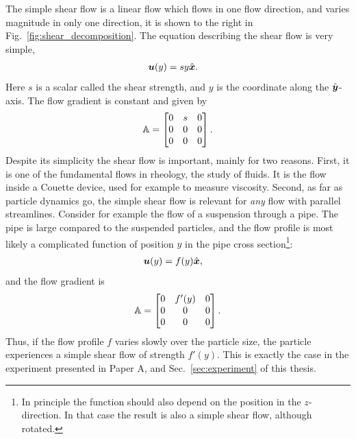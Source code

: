 \documentclass[thesis.tex]{subfiles}
\begin{document}
The simple shear flow is a linear flow which flows in one flow direction, and varies magnitude in only one direction, it is shown to the right in Fig.~\ref{fig:shear_decomposition}. The equation describing the shear flow is very simple,
\begin{align*}
	\mbox{\boldmath$u$}(y) &= s y \hat{\mbox{\boldmath$x$}}.
\end{align*}
Here $s$ is a scalar called the shear strength, and $y$ is the coordinate along the $\hat{\mbox{\boldmath$y$}}$-axis. The flow gradient is constant and given by
\begin{align*}
	\mathbb{A} = \begin{bmatrix}
		0 & s & 0 \\
		0 & 0 & 0 \\
		0 & 0 & 0 
	\end{bmatrix}.
\end{align*}
Despite its simplicity the shear flow is important, mainly for two reasons. First, it is one of the fundamental flows in rheology, the study of fluids. It is the flow inside a Couette device, used for example to measure viscosity. Second, as far as particle dynamics go, the simple shear flow is relevant for \emph{any} flow with parallel streamlines. Consider for example the flow of a suspension through a pipe. The pipe is large compared to the suspended particles, and the flow profile is most likely a complicated function of position $y$ in the pipe cross section\footnote{In principle the function should also depend on the position in the $z$-direction. In that case the result is also a simple shear flow, although rotated.}:
\begin{align*}
	\mbox{\boldmath$u$}(y) &= f(y)\hat{\mbox{\boldmath$x$}},
\end{align*}
 and the flow gradient is
\begin{align*}
	\mathbb{A} = \begin{bmatrix}
		0 & f'(y) & 0 \\
		0 & 0 & 0 \\
		0 & 0 & 0 
	\end{bmatrix}.
\end{align*}
Thus, if the flow profile $f$ varies slowly over the particle size, the particle experiences a simple shear flow of strength $f'(y)$. This is exactly the case in the experiment presented in Paper A, and Sec.~\ref{sec:experiment} of this thesis.
\end{document}
